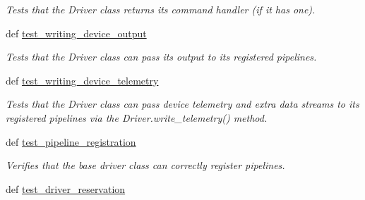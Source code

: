\begin{DoxyCompactItemize}
\begin{DoxyCompactList}\small\item\em Tests that the Driver class returns its command handler (if it has one). \end{DoxyCompactList}\item 
def \hyperlink{classhwm_1_1hardware_1_1devices_1_1drivers_1_1tests_1_1test__base__driver__class_1_1_test_base_driver_a0b74bdc7ab0ca112fd4f746e1d349069}{test\-\_\-writing\-\_\-device\-\_\-output}
\begin{DoxyCompactList}\small\item\em Tests that the Driver class can pass its output to its registered pipelines. \end{DoxyCompactList}\item 
def \hyperlink{classhwm_1_1hardware_1_1devices_1_1drivers_1_1tests_1_1test__base__driver__class_1_1_test_base_driver_acedb6b11e05334613cdffa261054d622}{test\-\_\-writing\-\_\-device\-\_\-telemetry}
\begin{DoxyCompactList}\small\item\em Tests that the Driver class can pass device telemetry and extra data streams to its registered pipelines via the Driver.\-write\-\_\-telemetry() method. \end{DoxyCompactList}\item 
\hypertarget{classhwm_1_1hardware_1_1devices_1_1drivers_1_1tests_1_1test__base__driver__class_1_1_test_base_driver_a3fcce29e3c28863a72e59b787e0e7f64}{def \hyperlink{classhwm_1_1hardware_1_1devices_1_1drivers_1_1tests_1_1test__base__driver__class_1_1_test_base_driver_a3fcce29e3c28863a72e59b787e0e7f64}{test\-\_\-pipeline\-\_\-registration}}\label{classhwm_1_1hardware_1_1devices_1_1drivers_1_1tests_1_1test__base__driver__class_1_1_test_base_driver_a3fcce29e3c28863a72e59b787e0e7f64}

\begin{DoxyCompactList}\small\item\em Verifies that the base driver class can correctly register pipelines. \end{DoxyCompactList}\item 
\hypertarget{classhwm_1_1hardware_1_1devices_1_1drivers_1_1tests_1_1test__base__driver__class_1_1_test_base_driver_a0cf0df34bd8ceefd2bfda5e11d1ea814}{def \hyperlink{classhwm_1_1hardware_1_1devices_1_1drivers_1_1tests_1_1test__base__driver__class_1_1_test_base_driver_a0cf0df34bd8ceefd2bfda5e11d1ea814}{test\-\_\-driver\-\_\-reservation}}\label{classhwm_1_1hardware_1_1devices_1_1drivers_1_1tests_1_1test__base__driver__class_1_1_test_base_driver_a0cf0df34bd8ceefd2bfda5e11d1ea814}


\end{DoxyCompactItemize}
